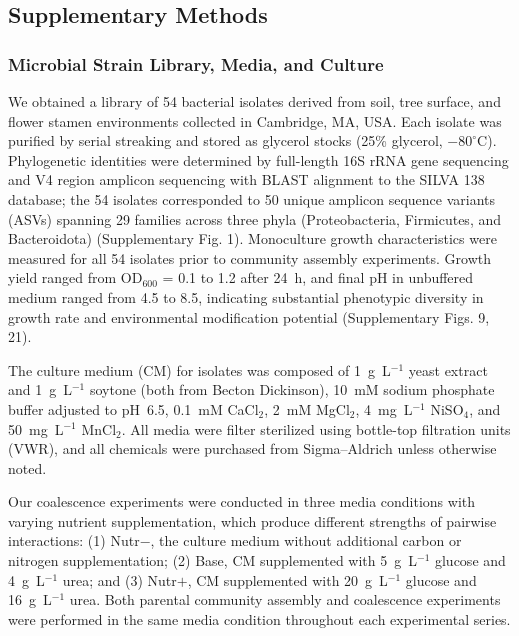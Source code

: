 \subsection*{Supplementary Methods}
\label{sec:suppl:methods}

\subsubsection*{Microbial Strain Library, Media, and Culture}
\label{sec:suppl:strains}

We obtained a library of 54 bacterial isolates derived from soil, tree surface, and flower stamen environments collected in Cambridge, MA, USA. Each isolate was purified by serial streaking and stored as glycerol stocks (25\% glycerol, $-80^\circ$C). Phylogenetic identities were determined by full-length 16S rRNA gene sequencing and V4 region amplicon sequencing with BLAST alignment to the SILVA 138 database; the 54 isolates corresponded to 50 unique amplicon sequence variants (ASVs) spanning 29 families across three phyla (Proteobacteria, Firmicutes, and Bacteroidota) (Supplementary Fig. 1). Monoculture growth characteristics were measured for all 54 isolates prior to community assembly experiments. Growth yield ranged from OD$_{600}$ = 0.1 to 1.2 after 24~h, and final pH in unbuffered medium ranged from 4.5 to 8.5, indicating substantial phenotypic diversity in growth rate and environmental modification potential (Supplementary Figs. 9, 21).

The culture medium (CM) for isolates was composed of 1~g~L$^{-1}$ yeast extract and 1~g~L$^{-1}$ soytone (both from Becton Dickinson), 10~mM sodium phosphate buffer adjusted to pH~6.5, 0.1~mM CaCl$_2$, 2~mM MgCl$_2$, 4~mg~L$^{-1}$ NiSO$_4$, and 50~mg~L$^{-1}$ MnCl$_2$. All media were filter sterilized using bottle-top filtration units (VWR), and all chemicals were purchased from Sigma--Aldrich unless otherwise noted.

Our coalescence experiments were conducted in three media conditions with varying nutrient supplementation, which produce different strengths of pairwise interactions: (1) Nutr$-$, the culture medium without additional carbon or nitrogen supplementation; (2) Base, CM supplemented with 5~g~L$^{-1}$ glucose and 4~g~L$^{-1}$ urea; and (3) Nutr$+$, CM supplemented with 20~g~L$^{-1}$ glucose and 16~g~L$^{-1}$ urea. Both parental community assembly and coalescence experiments were performed in the same media condition throughout each experimental series.

